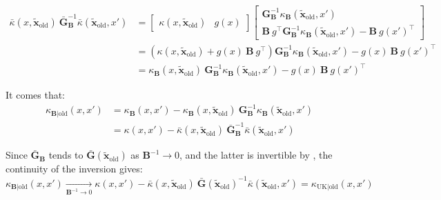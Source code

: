 \begin{equation}
	\begin{aligned}
	\bar{\kappa}(x,\tilde{\mathbf{x}}_{\mathrm{old}})\:\bar{\mathbf{G}}_{\mathbf{B}}^{-1}\bar{\kappa}(\tilde{\mathbf{x}}_{\mathrm{old}},x')&=\begin{bmatrix}\kappa(x,\tilde{\mathbf{x}}_{\mathrm{old}})&g(x)\end{bmatrix}\begin{bmatrix}\mathbf{G}_{\mathbf{B}}^{-1}\kappa_{\mathbf{B}}(\tilde{\mathbf{x}}_{\mathrm{old}},x')\\\mathbf{B}\:g^\top \mathbf{G}_{\mathbf{B}}^{-1}\kappa_{\mathbf{B}}(\tilde{\mathbf{x}}_{\mathrm{old}},x')-\mathbf{B}\:g(x')^\top\end{bmatrix}\\
	&=\left(\kappa(x,\tilde{\mathbf{x}}_{\mathrm{old}})+g(x)\:\mathbf{B}\:g^\top\right)\mathbf{G}_{\mathbf{B}}^{-1}\kappa_{\mathbf{B}}(\tilde{\mathbf{x}}_{\mathrm{old}},x')-g(x)\:\mathbf{B}\:g(x')^\top\\
	&=\kappa_{\mathbf{B}}(x,\tilde{\mathbf{x}}_{\mathrm{old}})\:\mathbf{G}_{\mathbf{B}}^{-1}\kappa_{\mathbf{B}}(\tilde{\mathbf{x}}_{\mathrm{old}},x')-g(x)\:\mathbf{B}\:g(x')^\top
	\end{aligned}
\end{equation}

It comes that:
\begin{equation}
	\begin{aligned}
	\kappa_{\mathbf{B}|\mathrm{old}}(x,x')&=\kappa_{\mathbf{B}}(x,x')-\kappa_{\mathbf{B}}(x,\tilde{\mathbf{x}}_{\mathrm{old}})\:\mathbf{G}_{\mathbf{B}}^{-1}\kappa_{\mathbf{B}}(\tilde{\mathbf{x}}_{\mathrm{old}},x')\\
	&=\kappa(x,x')-\bar{\kappa}(x,\tilde{\mathbf{x}}_{\mathrm{old}})\:\bar{\mathbf{G}}_{\mathbf{B}}^{-1}\bar{\kappa}(\tilde{\mathbf{x}}_{\mathrm{old}},x')
	\end{aligned}
\end{equation}

Since $\bar{\mathbf{G}}_{\mathbf{B}}$ tends to $\bar{\mathbf{G}}(\tilde{\mathbf{x}}_{\mathrm{old}})$ as $\mathbf{B}^{-1}\to0$, and the latter is invertible by , the continuity of the inversion gives:
\begin{equation}
	\kappa_{\mathbf{B}|\mathrm{old}}(x,x')\underset{\mathbf{B}^{-1}\to0}{\longrightarrow}\kappa(x,x')-\bar{\kappa}(x,\tilde{\mathbf{x}}_{\mathrm{old}})\:\bar{\mathbf{G}}(\tilde{\mathbf{x}}_{\mathrm{old}})^{-1}\bar{\kappa}(\tilde{\mathbf{x}}_{\mathrm{old}},x')=\kappa_{\mathrm{UK}|\mathrm{old}}(x,x')
\end{equation}

